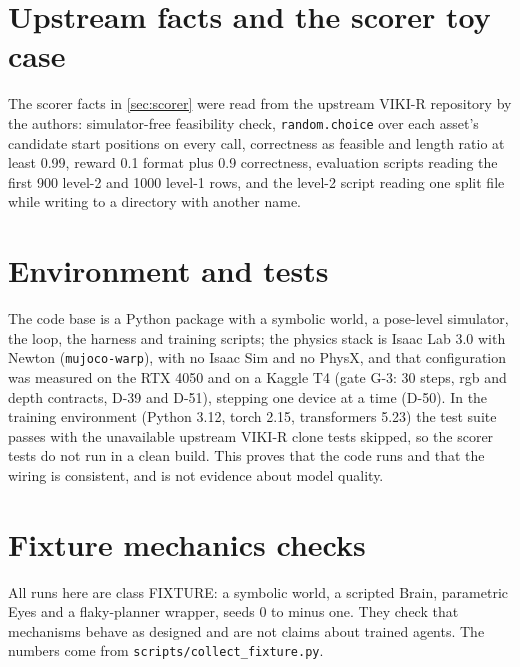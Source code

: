 \section{Upstream facts and the scorer toy case}\label{app:viki}
The scorer facts in \cref{sec:scorer} were read from the upstream VIKI-R repository by the authors: simulator-free feasibility check, \texttt{random.choice} over each asset's candidate start positions on every call, correctness as feasible and length ratio at least 0.99, reward 0.1 format plus 0.9 correctness, evaluation scripts reading the first 900 level-2 and 1000 level-1 rows, and the level-2 script reading one split file while writing to a directory with another name.

\section{Environment and tests}\label{app:env}
The code base is a Python package with a symbolic world, a pose-level simulator, the loop, the harness and training scripts; the physics stack is Isaac Lab 3.0 with Newton (\texttt{mujoco-warp}), with no Isaac Sim and no PhysX, and that configuration was measured on the RTX 4050 and on a Kaggle T4 (gate G-3: 30 steps, rgb and depth contracts, D-39 and D-51), stepping one device at a time (D-50).
In the training environment (Python 3.12, torch 2.15, transformers 5.23) the test suite passes with the unavailable upstream VIKI-R clone tests skipped, so the scorer tests do not run in a clean build.
This proves that the code runs and that the wiring is consistent, and is not evidence about model quality.

\section{Fixture mechanics checks}\label{app:fixture}
All runs here are class FIXTURE: a symbolic world, a scripted Brain, parametric Eyes and a flaky-planner wrapper, seeds 0 to \fxN{} minus one.
They check that mechanisms behave as designed and are not claims about trained agents.
The numbers come from \texttt{scripts/collect\_fixture.py}.

